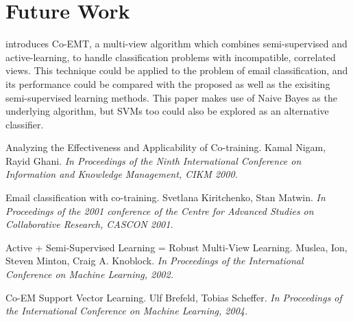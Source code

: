 \section{Future Work}
\cite{dunno} introduces Co-EMT, a multi-view algorithm which combines semi-supervised and active-learning, to handle classification problems with incompatible, correlated views. This technique could be applied to the problem of email classification, and its performance could be compared with the proposed as well as the exisiting semi-supervised learning methods. This paper makes use of Naive Bayes as the underlying algorithm, but SVMs too could also be explored as an alternative classifier.

\begin{thebibliography}{2}
 Analyzing the Effectiveness and Applicability
    of Co-training. Kamal Nigam, Rayid Ghani. \textit{In Proceedings of the Ninth International Conference on Information and Knowledge Management, CIKM 2000.}

 Email classification with co-training. Svetlana Kiritchenko, Stan Matwin. \textit{In Proceedings of the 2001 conference of the Centre for Advanced Studies on Collaborative Research, CASCON 2001.}

 Active + Semi-Supervised Learning = Robust Multi-View Learning. Muslea, Ion, Steven Minton, Craig A. Knoblock. \textit{In Proceedings of the International Conference on Machine Learning, 2002.}

 Co-EM Support Vector Learning. Ulf Brefeld, Tobias Scheffer. \textit{In Proceedings of the International Conference on Machine Learning, 2004.}
\end{thebibliography}


